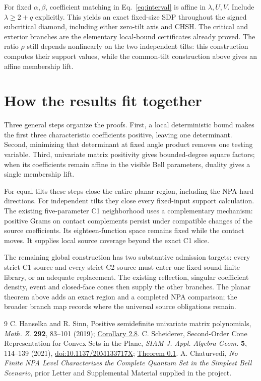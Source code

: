 \documentclass[11pt]{article}
\begin{document}
For fixed \(\alpha,\beta\), coefficient matching in Eq.~\eqref{eq:interval}
is affine in \(\lambda,U,V\). Include \(\lambda\ge2+q\) explicitly.
This yields an exact fixed-size SDP throughout the signed subcritical diamond,
including either zero-tilt axis and CHSH. The critical and exterior branches
are the elementary local-bound certificates already proved.
The ratio \(\rho\) still depends nonlinearly on the two independent tilts:
this construction computes their support values, while the common-tilt
construction above gives an affine membership lift.

\section*{How the results fit together}

Three general steps organize the proofs. First, a local deterministic bound makes
the first three characteristic coefficients positive, leaving one determinant.
Second, minimizing that determinant at fixed angle product removes one testing
variable. Third, univariate matrix positivity gives bounded-degree square factors;
when its coefficients remain affine in the visible Bell parameters, duality gives
a single membership lift.

For equal tilts these steps close the entire planar region, including the NPA-hard
directions. For independent tilts they close every fixed-input support calculation.
The existing five-parameter C1 neighborhood uses a complementary mechanism:
positive Grams on contact complements persist under compatible changes of the
source coefficients. Its eighteen-function space remains fixed while the contact
moves. It supplies local source coverage beyond the exact C1 slice.

The remaining global construction has two substantive admission targets:
every strict C1 source and every strict C2 source must enter one fixed sound
finite library, or an adequate replacement. The existing reflection, singular
coefficient density, event and closed-face cones then supply the other branches.
The planar theorem above adds an exact region and a completed NPA comparison;
the broader branch map records where the universal source obligations remain.

\begin{thebibliography}{9}
 C. Hanselka and R. Sinn, Positive semidefinite univariate matrix
polynomials, \emph{Math. Z.} \textbf{292}, 83--101 (2019);
\href{https://arxiv.org/pdf/1707.08261}{Corollary 2.8}.
 C. Scheiderer, Second-Order Cone Representation for Convex Sets in
the Plane, \emph{SIAM J. Appl. Algebra Geom.} \textbf{5}, 114--139 (2021),
\href{https://doi.org/10.1137/20M133717X}{doi:10.1137/20M133717X};
\href{https://arxiv.org/html/2004.04196v2}{Theorem 0.1}.
 A. Chaturvedi, \emph{No Finite NPA Level Characterizes the Complete
Quantum Set in the Simplest Bell Scenario}, prior Letter and Supplemental
Material supplied in the project.
\end{thebibliography}
\end{document}
